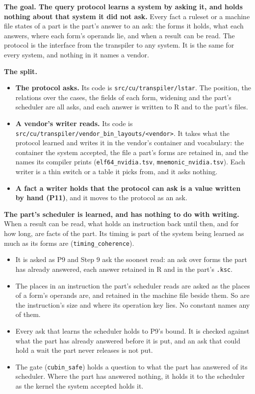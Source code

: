 \textbf{The goal. The query protocol learns a system by asking it, and holds nothing about that system it did not ask.} Every fact a ruleset or a machine file states of a part is the part's answer to an ask: the forms it holds, what each answers, where each form's operands lie, and when a result can be read. The protocol is the interface from the transpiler to any system. It is the same for every system, and nothing in it names a vendor.

\textbf{The split.}

\begin{itemize}
\item \textbf{The protocol asks.} Its code is \texttt{src/\allowbreak{}cu/\allowbreak{}transpiler/\allowbreak{}lstar}. The position, the relations over the cases, the fields of each form, widening and the part's scheduler are all asks, and each answer is written to R and to the part's files.
\item \textbf{A vendor's writer reads.} Its code is \texttt{src/\allowbreak{}cu/\allowbreak{}transpiler/\allowbreak{}vendor\_\allowbreak{}bin\_\allowbreak{}layouts/\allowbreak{}<vendor>}. It takes what the protocol learned and writes it in the vendor's container and vocabulary: the container the system accepted, the file a part's forms are retained in, and the names its compiler prints (\texttt{elf64\_\allowbreak{}nvidia.\allowbreak{}tsv}, \texttt{mnemonic\_\allowbreak{}nvidia.\allowbreak{}tsv}). Each writer is a thin switch or a table it picks from, and it asks nothing.
\item \textbf{A fact a writer holds that the protocol can ask is a value written by hand (P11)}, and it moves to the protocol as an ask.
\end{itemize}

\textbf{The part's scheduler is learned, and has nothing to do with writing.} When a result can be read, what holds an instruction back until then, and for how long, are facts of the part. Its timing is part of the system being learned as much as its forms are (\texttt{timing\_\allowbreak{}coherence}).

\begin{itemize}
\item It is asked as P9 and Step 9 ask the soonest read: an ask over forms the part has already answered, each answer retained in R and in the part's \texttt{.\allowbreak{}ksc}.
\item The places in an instruction the part's scheduler reads are asked as the places of a form's operands are, and retained in the machine file beside them. So are the instruction's size and where its operation key lies. No constant names any of them.
\item Every ask that learns the scheduler holds to P9's bound. It is checked against what the part has already answered before it is put, and an ask that could hold a wait the part never releases is not put.
\item The gate (\texttt{cubin\_\allowbreak{}safe}) holds a question to what the part has answered of its scheduler. Where the part has answered nothing, it holds it to the scheduler as the kernel the system accepted holds it.
\end{itemize}


